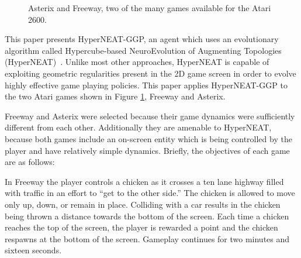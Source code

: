 \documentclass{sig-alternate}
\begin{document}
\begin{figure}[t]
  \centering
  \hspace{.1in}
  \hspace{.1in}
 \caption{Asterix and Freeway, two of the many games available for the Atari 2600.}
 \label{fig:samplegames}
\end{figure}

This paper presents HyperNEAT-GGP, an agent which uses an evolutionary algorithm called Hypercube-based NeuroEvolution of Augmenting Topologies (HyperNEAT)~\cite{gauci08}. Unlike most other approaches, HyperNEAT is capable of exploiting geometric regularities present in the 2D game screen in order to evolve highly effective game playing policies. This paper applies HyperNEAT-GGP to the two Atari games shown in Figure \ref{fig:samplegames}, Freeway and Asterix.

Freeway and Asterix were selected because their game dynamics were sufficiently different from each other. Additionally they are amenable to HyperNEAT, because both games include an on-screen entity which is being controlled by the player and have relatively simple dynamics. Briefly, the objectives of each game are as follows:

In Freeway the player controls a chicken as it crosses a ten lane highway filled with traffic in an effort to ``get to the other side.'' The chicken is allowed to move only up, down, or remain in place. Colliding with a car results in the chicken being thrown a distance towards the bottom of the screen. Each time a chicken reaches the top of the screen, the player is rewarded a point and the chicken respawns at the bottom of the screen. Gameplay continues for two minutes and sixteen seconds. 
\end{document}

